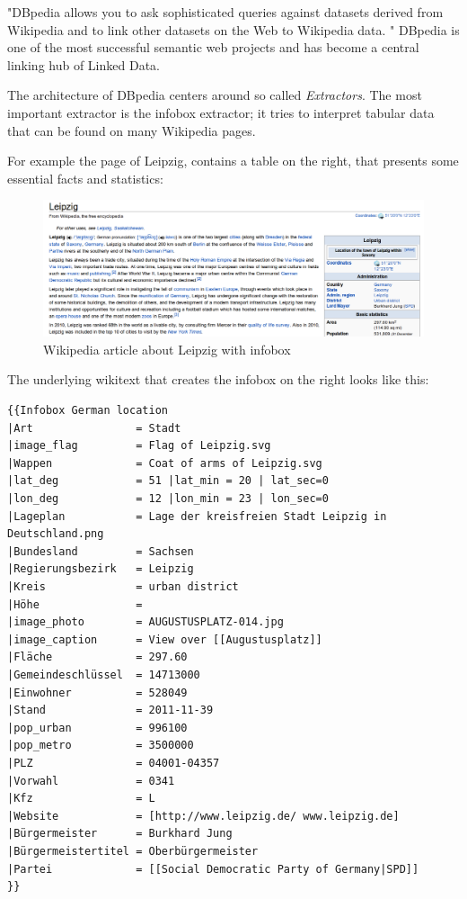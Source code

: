 "DBpedia allows you to ask sophisticated queries against datasets derived from Wikipedia and to link other datasets on the Web to Wikipedia data.
"\cite{dbpedia_iswc}
DBpedia is one of the most successful semantic web projects and has become a central linking hub of Linked Data.

The architecture of DBpedia centers around so called \textit{Extractors}. The most important extractor is the infobox extractor; it tries to interpret tabular data that can be found on many Wikipedia pages.

For example the page of Leipzig, contains a table on the right, that presents some essential facts and statistics:

\begin{figure}[htbp]
\centering
\includegraphics[width=\textwidth]{./images/leipzig-full}
\caption{Wikipedia article about Leipzig with infobox}
\label{fig:leipzig-full}
\end{figure}

The underlying wikitext that creates the infobox on the right looks like this:

\begin{lstlisting}[style=wikitext]
{{Infobox German location
|Art                = Stadt
|image_flag         = Flag of Leipzig.svg
|Wappen             = Coat of arms of Leipzig.svg
|lat_deg            = 51 |lat_min = 20 | lat_sec=0
|lon_deg            = 12 |lon_min = 23 | lon_sec=0
|Lageplan           = Lage der kreisfreien Stadt Leipzig in Deutschland.png
|Bundesland         = Sachsen
|Regierungsbezirk   = Leipzig
|Kreis              = urban district
|Höhe               =
|image_photo        = AUGUSTUSPLATZ-014.jpg
|image_caption      = View over [[Augustusplatz]]
|Fläche             = 297.60
|Gemeindeschlüssel  = 14713000
|Einwohner          = 528049
|Stand              = 2011-11-39
|pop_urban          = 996100
|pop_metro          = 3500000
|PLZ                = 04001-04357
|Vorwahl            = 0341
|Kfz                = L
|Website            = [http://www.leipzig.de/ www.leipzig.de]
|Bürgermeister      = Burkhard Jung
|Bürgermeistertitel = Oberbürgermeister
|Partei             = [[Social Democratic Party of Germany|SPD]]
}}
\end{lstlisting}

